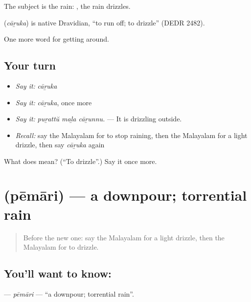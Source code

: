 The subject is the rain:  , the rain drizzles.

\begin{cousinweb}
\textbf{} (\emph{cāṟuka}) is native Dravidian, \textquotedblleft{}to run off; to drizzle\textquotedblright{} (DEDR 2482).
\end{cousinweb}

\begin{grammarlens}[title={What you've built}]
One more word for getting around.
\end{grammarlens}

\subsection*{Your turn}
\begin{itemize}
\raggedright
  \item \emph{Say it:} \emph{cāṟuka}
  \item \emph{Say it:} \emph{cāṟuka}, once more
  \item \emph{Say it:} \emph{puṟattŭ maḻa cāṟunnu.} — It is drizzling outside.
  \item \emph{Recall:} say the Malayalam for to stop raining, then the Malayalam for a light drizzle, then say \emph{cāṟuka} again
\end{itemize}

\begin{tcolorbox}[breakable,colback=teal!4,colframe=teal!35!black,title={Before you move on}]
What does  mean? (\textquotedblleft{}To drizzle\textquotedblright{}.) Say it once more.
\end{tcolorbox}
\section[\texorpdfstring{\ml{പേമാരി} (pēmāri)}{പേമാരി (pēmāri)}]{ (pēmāri) — a downpour; torrential rain}

\label{lesson:ML-C508-pemari}



\begin{quote}
Before the new one: say the Malayalam for a light drizzle, then the Malayalam for to drizzle.
\end{quote}

\subsection*{You'll want to know: }
\textbf{} — \emph{pēmāri} — \textquotedblleft{}a downpour; torrential rain\textquotedblright{}.

